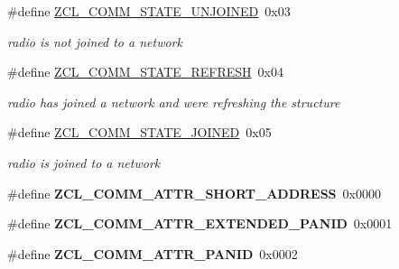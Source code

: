 \begin{DoxyCompactItemize}
\#define \hyperlink{group__zcl__commissioning_ga60e0581b929ae09262680136205a2516}{Z\+C\+L\+\_\+\+C\+O\+M\+M\+\_\+\+S\+T\+A\+T\+E\+\_\+\+U\+N\+J\+O\+I\+N\+ED}~0x03
\begin{DoxyCompactList}\small\item\em radio is not joined to a network \end{DoxyCompactList}\item 
\mbox{\label{group__zcl__commissioning_gae9523cf195068a92283ba0d44424e105}} 
\#define \hyperlink{group__zcl__commissioning_gae9523cf195068a92283ba0d44424e105}{Z\+C\+L\+\_\+\+C\+O\+M\+M\+\_\+\+S\+T\+A\+T\+E\+\_\+\+R\+E\+F\+R\+E\+SH}~0x04
\begin{DoxyCompactList}\small\item\em radio has joined a network and we\textquotesingle{}re refreshing the structure \end{DoxyCompactList}\item 
\mbox{\label{group__zcl__commissioning_ga4d8a61e021ef1c4826b18d6eb356c96e}} 
\#define \hyperlink{group__zcl__commissioning_ga4d8a61e021ef1c4826b18d6eb356c96e}{Z\+C\+L\+\_\+\+C\+O\+M\+M\+\_\+\+S\+T\+A\+T\+E\+\_\+\+J\+O\+I\+N\+ED}~0x05
\begin{DoxyCompactList}\small\item\em radio is joined to a network \end{DoxyCompactList}\item 
\mbox{\label{group__zcl__commissioning_gaab7f9cfea2353bff92f5aeb2594ca8e3}} 
\#define {\bfseries Z\+C\+L\+\_\+\+C\+O\+M\+M\+\_\+\+A\+T\+T\+R\+\_\+\+S\+H\+O\+R\+T\+\_\+\+A\+D\+D\+R\+E\+SS}~0x0000
\item 
\mbox{\label{group__zcl__commissioning_ga9a4892bd6e84796fe6bf8ace85c642cb}} 
\#define {\bfseries Z\+C\+L\+\_\+\+C\+O\+M\+M\+\_\+\+A\+T\+T\+R\+\_\+\+E\+X\+T\+E\+N\+D\+E\+D\+\_\+\+P\+A\+N\+ID}~0x0001
\item 
\mbox{\label{group__zcl__commissioning_ga0349ff92388b56a9c5ca0d9cf5f77b4e}} 
\#define {\bfseries Z\+C\+L\+\_\+\+C\+O\+M\+M\+\_\+\+A\+T\+T\+R\+\_\+\+P\+A\+N\+ID}~0x0002
\item 
\mbox{\label{group__zcl__commissioning_gada5c0da80bfed9dfd9d5acc79f59c020}} 

\end{DoxyCompactItemize}
